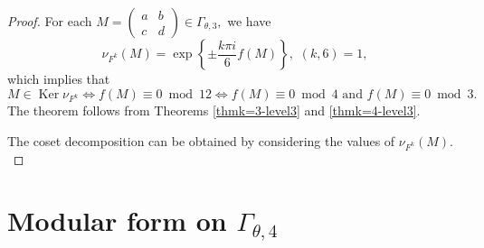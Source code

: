 \documentclass[12pt]{article}
\theoremstyle{definition}
\numberwithin{equation}{section}
\numberwithin{theorem}{section}
\newcommand{\Ker}{\operatorname{Ker}}
\begin{document}
\begin{proof}
For each 
$
M
=
\begin{pmatrix}
a & b \\
c & d
\end{pmatrix}
\in
\Gamma_{\theta,3}, 
$ 
we have 
\begin{equation*}
\nu_{ F^{k}  }(M)=
\exp
\left\{
\pm
\frac{
k
 \pi i
}
{6} 
f(M) 
\right\}, \,\,
(k,6)=1, 
\end{equation*}
which implies that 
\begin{equation*}
M
\in
\Ker \nu_{F^{k}}
\Longleftrightarrow 
f(M)\equiv 0 \bmod{12}
\Longleftrightarrow 
f(M)\equiv 0 \bmod{4} \,\,
\mathrm{and} \,\,
f(M)\equiv 0 \bmod{3}. 
\end{equation*}
The theorem follows from Theorems \ref{thmk=3-level3} and \ref{thmk=4-level3}.
\par
The coset decomposition can be obtained by considering the values of $\nu_{ F^{k}  }(M).$
\end{proof}






























































\section{Modular form on $\Gamma_{\theta,4}$ }
\label{sec:level4}
\end{document}
